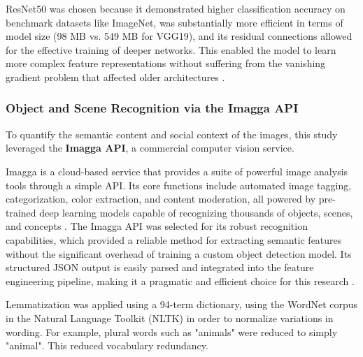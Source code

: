 ResNet50 was chosen because it demonstrated higher classification accuracy on benchmark datasets like ImageNet, was substantially more efficient in terms of model size (98 MB vs. 549 MB for VGG19), and its residual connections allowed for the effective training of deeper networks. This enabled the model to learn more complex feature representations without suffering from the vanishing gradient problem that affected older architectures \citep{he2015, simonyan2014very}.

\subsubsection{Object and Scene Recognition via the Imagga API}
To quantify the semantic content and social context of the images, this study leveraged the \textbf{Imagga API}, a commercial computer vision service.

Imagga is a cloud-based service that provides a suite of powerful image analysis tools through a simple API. Its core functions include automated image tagging, categorization, color extraction, and content moderation, all powered by pre-trained deep learning models capable of recognizing thousands of objects, scenes, and concepts \citep{imagga_website, imagga_solutions}. The Imagga API was selected for its robust recognition capabilities, which provided a reliable method for extracting semantic features without the significant overhead of training a custom object detection model. Its structured JSON output is easily parsed and integrated into the feature engineering pipeline, making it a pragmatic and efficient choice for this research \citep{imagga_docs}.


Lemmatization was applied using a 94-term dictionary, using the WordNet corpus in the Natural Language Toolkit (NLTK) \citep{bird2009natural} in order to normalize variations in wording. For example, plural words such as "animals" were reduced to simply "animal". This reduced vocabulary redundancy.

